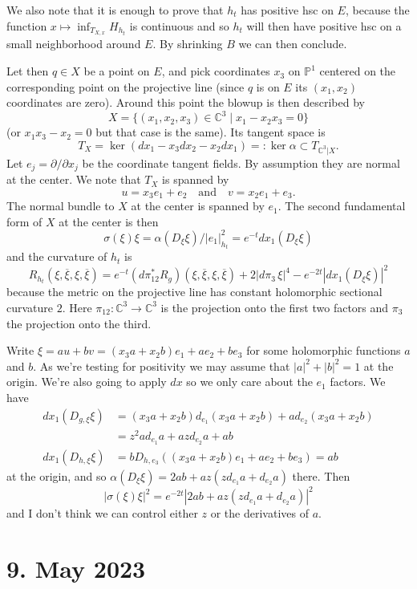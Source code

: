 \documentclass[11pt]{article}
\theoremstyle{definition}
\newcommand{\kk}[1]{\mathbb{#1}}
\def\qandq{\quad\text{and}\quad}
\def\ov#1{\overline{#1}}
\begin{document}
We also note that it is enough to prove that $h_t$ has positive hsc on $E$,
because the function $x \mapsto \inf_{T_{X,x}} H_{h_t}$ is continuous
and so $h_t$ will then have positive hsc on a small neighborhood around $E$.
By shrinking $B$ we can then conclude.

Let then $q \in X$ be a point on $E$, and pick coordinates $x_3$ on $\kk P^1$
centered on the corresponding point on the projective line (since $q$ is on $E$
its $(x_1,x_2)$ coordinates are zero).
Around this point the blowup is then described by
$$
X = \{(x_1,x_2,x_3) \in \kk C^3 \mid x_1 - x_2x_3 = 0 \}
$$
(or $x_1x_3 - x_2 = 0$ but that case is the same).
Its tangent space is
$$
T_X = \ker(dx_1 - x_3 dx_2 - x_2 dx_1)
=: \ker \alpha
\subset T_{\kk C^3|X}.
$$
Let $e_j = \partial / \partial x_j$ be the coordinate tangent fields.
By assumption they are normal at the center.
We note that $T_X$ is spanned by
$$
u = x_3 e_1 + e_2
\qandq
v = x_2 e_1 + e_3.
$$
The normal bundle to $X$ at the center is spanned by $e_1$.
The second fundamental form of $X$ at the center is then
$$
\sigma(\xi)\xi
= \alpha(D_\xi \xi) / |e_1|^2_{h_t}
= e^{-t} dx_1(D_\xi \xi)
$$
and the curvature of $h_t$ is
$$
R_{h_t}(\xi, \ov\xi, \xi, \ov\xi)
= e^{-t} (d\pi_{12}^* R_{g})(\xi, \ov\xi, \xi, \ov\xi)
+ 2 |d\pi_{3} \, \xi|^4
- e^{-2t} |dx_1(D_\xi \xi)|^2
$$
because the metric on the projective line has constant holomorphic sectional
curvature $2$.
Here $\pi_{12}: \kk C^3 \to \kk C^3$ is the projection onto the first two factors
and $\pi_3$ the projection onto the third.

Write $\xi = a u + b v = (x_3a + x_2b) e_1 + a e_2 + b e_3$ for some
holomorphic functions $a$ and $b$. As we're testing for positivity we may
assume that $|a|^2 + |b|^2 = 1$ at the origin.
We're also going to apply $dx$ so we only care about the $e_1$ factors.
We have
\begin{align*}
dx_1(D_{g,\xi}\xi)
&= (x_3a + x_2b) d_{e_1}(x_3 a + x_2b)
+ a d_{e_2}(x_3 a + x_2b)
\\
&= z^2 a d_{e_1}a + a z d_{e_2} a + ab
\\
dx_1(D_{h,\xi}\xi)
&= b D_{h,e_3}((x_3a + x_2b) e_1 + a e_2 + b e_3)
= ab
\end{align*}
at the origin, and so
$\alpha(D_{\xi} \xi) = 2 ab + az( z d_{e_1}a + d_{e_2} a)$
there. Then
$$
|\sigma(\xi)\xi|^2
= e^{-2t} |2ab + az( z d_{e_1}a + d_{e_2} a)|^2
$$
and I don't think we can control either $z$ or the derivatives of $a$.


\section{9. May 2023}
\end{document}
